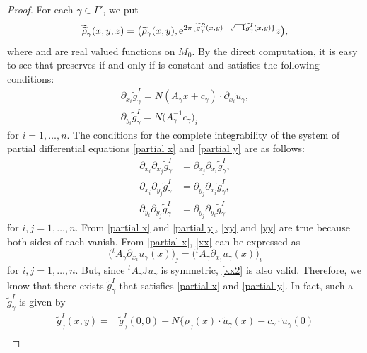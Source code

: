 \documentclass[10pt,a4paper]{amsart}
\numberwithin{equation}{section}
\renewcommand{\tilde}{\widetilde}
\newcommand{\vardbtilde}[1]{\tilde{\raisebox{0pt}[0.85\height]{$\tilde{#1}$}}}
\def\J{\mathrm{J}}
\begin{document}
\begin{proof}
For each $\gamma\in \Gamma'$, we put
\[
{\vardbtilde \rho}_\gamma (x,y,z)=\bigl( {\tilde \rho}_\gamma (x,y),{\rm e}^{2\pi\{{\tilde g}^R_\gamma (x,y)+\sqrt{-1}{\tilde g}^I_\gamma(x,y)\}}z\bigr) ,
\]
where \smash{${\tilde g}^R_\gamma$} and \smash{${\tilde g}^I_\gamma$} are real valued functions on $M_0$. By the direct computation, it is easy to see
that \smash{${\vardbtilde \rho}_\gamma$} preserves  if and only if \smash{${\tilde g}^R_\gamma$} is constant and \smash{${\tilde g}^I_\gamma$} satisfies the following conditions:
\begin{gather}
\partial_{x_i}{\tilde g}^I_\gamma=N(A_\gamma x+c_\gamma)\cdot \partial_{x_i} {\tilde u}_\gamma,\label{partial x}\\
\partial_{y_i} {\tilde g}^I_\gamma=N\bigl(A_\gamma^{-1}c_\gamma\bigr)_i \label{partial y}
\end{gather}
for $i=1, \ldots , n$.
The conditions for the complete integrability of the system of partial differential equations \eqref{partial x} and \eqref{partial y} are as follows:
\begin{align}
\partial_{x_i}\partial_{x_j}{\tilde g}^I_\gamma&=\partial_{x_j}\partial_{x_i}{\tilde g}^I_\gamma , \label{xx}\\
\partial_{x_i}\partial_{y_j}{\tilde g}^I_\gamma&=\partial_{y_j}\partial_{x_i}{\tilde g}^I_\gamma , \label{xy}\\
\partial_{y_i}\partial_{y_j}{\tilde g}^I_\gamma&=\partial_{y_j}\partial_{y_i}{\tilde g}^I_\gamma \label{yy}
\end{align}
for $i, j=1, \ldots , n$. From \eqref{partial x} and \eqref{partial y}, \eqref{xy} and \eqref{yy} are true because both sides of each vanish. From \eqref{partial x}, \eqref{xx} can be expressed as
\begin{equation}\label{xx2}
\bigl( {}^tA_\gamma\partial_{x_i}u_\gamma (x)\bigr)_j=\bigl( {}^tA_\gamma\partial_{x_j}u_\gamma (x)\bigr)_i
\end{equation}
for $i, j=1, \ldots , n$. But, since ${}^tA_\gamma \J u_\gamma$ is symmetric, \eqref{xx2} is also valid. Therefore, we know that there exists ${\tilde g}^I_\gamma$ that satisfies \eqref{partial x} and \eqref{partial y}. In fact, such a ${\tilde g}^I_\gamma$ is given by
 \begin{align}
 {\tilde g}^I_\gamma (x,y)={}&{\tilde g}^I_\gamma (0,0)+N\biggl\{\rho_\gamma (x)\cdot {\tilde u}_\gamma(x)-c_\gamma \cdot {\tilde u}_\gamma(0) \nonumber\\

\end{align}
\end{proof}
\end{document}
